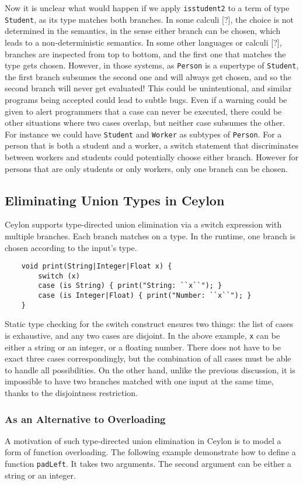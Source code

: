 \noindent Now it is unclear what would happen if we apply \lstinline{isstudent2}
to a term of type \lstinline{Student}, as its type matches both branches. In some
calculi [?], the choice is not determined in the semantics, in the sense either
branch can be chosen, which leads to a non-deterministic semantics. In some
other languages or calculi [?], branches are inspected from top to bottom, and the first one
that matches the type gets chosen. However, in those systems, as
\lstinline{Person} is a supertype of \lstinline{Student}, the first branch
subsumes the second one and will always get chosen, and so the second branch
will never get evaluated! This could be unintentional, and similar programs  
being accepted could lead to subtle bugs. Even if a warning could be given
to alert programmers that a case can never be executed, there could be
other situations where two cases overlap, but neither case subsumes the other.
For instance we could have \lstinline{Student} and \lstinline{Worker} as
subtypes of \lstinline{Person}. For a person that is both a student and a worker,
a switch statement that discriminates between workers and students could
potentially choose either branch. However for persons that are only students
or only workers, only one branch can be chosen.

\subsection{Eliminating Union Types in Ceylon}
Ceylon supports type-directed union elimination via a switch expression with
multiple branches. Each branch matches on a type.
In the runtime, one branch is chosen according to the input's type.
\begin{lstlisting}
	void print(String|Integer|Float x) {
		switch (x)
		case (is String) { print("String: ``x``"); }
		case (is Integer|Float) { print("Number: ``x``"); }
	}
\end{lstlisting}
%
Static type checking for the switch construct ensures two things: the 
list of cases is exhaustive, and any two cases are disjoint.
In the above example, \lstinline{x} can be either a string or an integer,
or a floating number. There does not have to be exact three cases correspondingly,
but the combination of all cases must be able to handle all possibilities.
On the other hand, unlike the previous discussion, it is impossible to have two
branches matched with one input at the same time, thanks to the disjointness
restriction.

\subsubsection*{As an Alternative to Overloading}
A motivation of such type-directed union elimination in Ceylon is to
model a form of function overloading.
The following example demonstrate how to define a function \lstinline{padLeft}.
It takes two arguments. The second argument can be either a string or
an integer.

